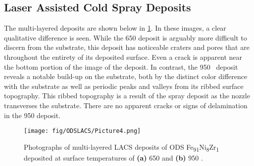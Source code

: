 		\subsection*{Laser Assisted Cold Spray Deposits}



			The multi-layered deposits are shown below in \ref{fig:ODSLACS4}. In these images, a clear qualitative difference is seen. While the 650 \celsius{} deposit is arguably more difficult to discern from the substrate, this deposit has noticeable craters and pores that are throughout the entirety of its deposited surface. Even a crack is apparent near the bottom portion of the image of the deposit. In contrast, the 950 \celsius{} deposit reveals a notable build-up on the substrate, both by the distinct color difference with the substrate as well as periodic peaks and valleys from its ribbed surface topography. This ribbed topography is a result of the spray deposit as the nozzle transverses the substrate. There are no apparent cracks or signs of delamination in the 950 \celsius{} deposit. 


			\begin{figure}
				\centering
				\texttt{[image: fig/ODSLACS/Picture4.png]}
				\caption{Photographs of multi-layered LACS deposits of ODS Fe\textsubscript{91}Ni\textsubscript{8}Zr\textsubscript{1 }deposited at surface temperatures of\textbf{ (a) }650 \celsius{} and \textbf{(b)} 950 \celsius{}.}
				\label{fig:ODSLACS4}
			\end{figure}



